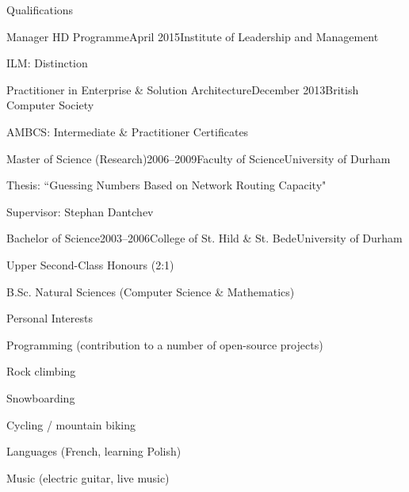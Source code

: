 \documentclass{cv}
\begin{document}
\begin{rSection}{Qualifications}

\begin{rSubsection}{Manager HD Programme}{April 2015}{Institute of Leadership and Management}{}
\item ILM: Distinction
\end{rSubsection}

\begin{rSubsection}{Practitioner in Enterprise \& Solution Architecture}{December 2013}{British Computer Society}{}
\item AMBCS: Intermediate \& Practitioner Certificates
\end{rSubsection}

\begin{rSubsection}{Master of Science (Research)}{2006--2009}{Faculty of Science}{University of Durham}
\item Thesis: ``Guessing Numbers Based on Network Routing Capacity"
\item Supervisor: Stephan Dantchev
\end{rSubsection}

\begin{rSubsection}{Bachelor of Science}{2003--2006}{College of St. Hild \& St. Bede}{University of Durham}
\item Upper Second-Class Honours (2:1)
\item B.Sc. Natural Sciences (Computer Science \& Mathematics)
\end{rSubsection}

\end{rSection}


\begin{rSection}{Personal Interests}

\begin{rSubsection}{}{}{}{}
\item Programming (contribution to a number of open-source projects)
\item Rock climbing
\item Snowboarding
\item Cycling / mountain biking
\item Languages (French, learning Polish)
\item Music (electric guitar, live music)
\end{rSubsection}

\end{rSection}
\end{document}
